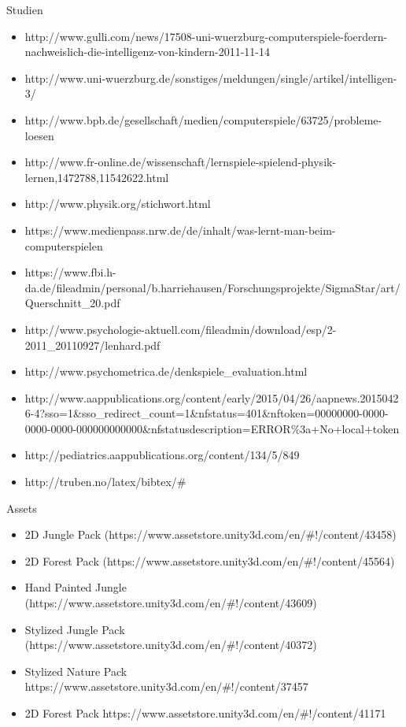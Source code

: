Studien
\begin{itemize}
\item \circledmark\quad http://www.gulli.com/news/17508-uni-wuerzburg-computerspiele-foerdern-nachweislich-die-intelligenz-von-kindern-2011-11-14
\item \circledmark\quad http://www.uni-wuerzburg.de/sonstiges/meldungen/single/artikel/intelligen-3/
\item \circledmark\quad http://www.bpb.de/gesellschaft/medien/computerspiele/63725/probleme-loesen
\item \circledmark\quad http://www.fr-online.de/wissenschaft/lernspiele-spielend-physik-lernen,1472788,11542622.html
\item http://www.physik.org/stichwort.html
\item \circledmark\quad https://www.medienpass.nrw.de/de/inhalt/was-lernt-man-beim-computerspielen
\item https://www.fbi.h-da.de/fileadmin/personal/b.harriehausen/Forschungsprojekte/SigmaStar/art/Querschnitt\_20.pdf
\item \circledmark\quad http://www.psychologie-aktuell.com/fileadmin/download/esp/2-2011\_20110927/lenhard.pdf
\item \circledmark\quad http://www.psychometrica.de/denkspiele\_evaluation.html
\item \circledmark\quad http://www.aappublications.org/content/early/2015/04/26/aapnews.20150426-4?sso=1\&sso\_redirect\_count=1\&nfstatus=401\&nftoken=00000000-0000-0000-0000-000000000000\&nfstatusdescription=ERROR\%3a+No+local+token
\item \circledmark\quad http://pediatrics.aappublications.org/content/134/5/849
\item http://truben.no/latex/bibtex/\#
\end{itemize}


Assets
\begin{itemize}
\item 2D Jungle Pack (https://www.assetstore.unity3d.com/en/\#!/content/43458)
\item 2D Forest Pack (https://www.assetstore.unity3d.com/en/\#!/content/45564)
\item Hand Painted Jungle (https://www.assetstore.unity3d.com/en/\#!/content/43609)
\item Stylized Jungle Pack (https://www.assetstore.unity3d.com/en/\#!/content/40372)
\item Stylized Nature Pack 
https://www.assetstore.unity3d.com/en/\#!/content/37457
\item 2D Forest Pack
https://www.assetstore.unity3d.com/en/\#!/content/41171


\end{itemize}

\newpage